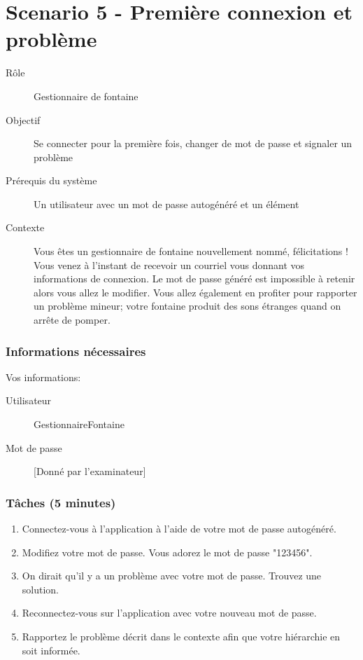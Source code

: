 \documentclass[a4paper, 11pt]{article}
\begin{document}
\newpage

\section*{Scenario 5 - Première connexion et problème}
    \begin{description}
        \item[Rôle] Gestionnaire de fontaine
        \item[Objectif] Se connecter pour la première fois, changer de mot de passe et signaler un problème
        \item[Prérequis du système] Un utilisateur avec un mot de passe autogénéré et un élément
        \item[Contexte] Vous êtes un gestionnaire de fontaine nouvellement nommé, félicitations ! Vous venez à l'instant de recevoir un courriel vous donnant vos informations de connexion. Le mot de passe généré est impossible à retenir alors vous allez le modifier. Vous allez également en profiter pour rapporter un problème mineur; votre fontaine produit des sons étranges quand on arrête de pomper.
    \end{description}

    \subsubsection*{Informations nécessaires}
    Vos informations:
    \begin{description}
        \item[Utilisateur] GestionnaireFontaine
        \item[Mot de passe] [Donné par l'examinateur]
    \end{description}

    \subsubsection*{Tâches (5 minutes)}
        \begin{enumerate}
            \item Connectez-vous à l'application à l'aide de votre mot de passe autogénéré.
            \item Modifiez votre mot de passe. Vous adorez le mot de passe "123456".
            \item On dirait qu'il y a un problème avec votre mot de passe. Trouvez une solution.
            \item Reconnectez-vous sur l'application avec votre nouveau mot de passe.
            \item Rapportez le problème décrit dans le contexte afin que votre hiérarchie en soit informée.
        \end{enumerate}
\end{document}
